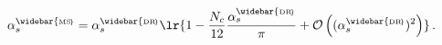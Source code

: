 \begin{equation}
\alpha_s^{{\rm \widebar{\scriptscriptstyle MS\!}}}
=
\alpha_s^{{\rm \widebar{\scriptscriptstyle DR\!}}}
\lr{
1 -
\frac{N_c}{12}\frac{\alpha_s^{{\rm \widebar{\scriptscriptstyle DR\!}}}}{\pi}
+
\mathcal{O}
\left(
(\alpha_s^{{\rm \widebar{\scriptscriptstyle DR\!}}})^2
\right)
}
\, .
\end{equation}


